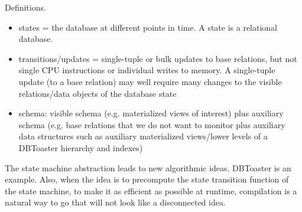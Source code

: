 Definitions.
\begin{itemize}
\item
states = the database at different points in time. A state is a relational database.

\item
transitions/updates = single-tuple or bulk updates to base relations, but not single CPU instructions or individual writes to memory. A single-tuple update (to a base relation) may well require many changes to the visible relations/data objects of the database state

\item
schema: visible schema (e.g. materialized views of interest) plus auxiliary schema (e.g. base relations that we do not want to monitor plus auxiliary data structures such as auxiliary materialized views/lower levels of a DBToaster hierarchy and indexes)
\end{itemize}


The state machine abstraction leads to new algorithmic ideas. DBToaster is an example. Also, when the idea is to precompute the state transition function of the state machine, to make it as efficient as possible at runtime, compilation is a natural way to go that will not look like a disconnected idea.


